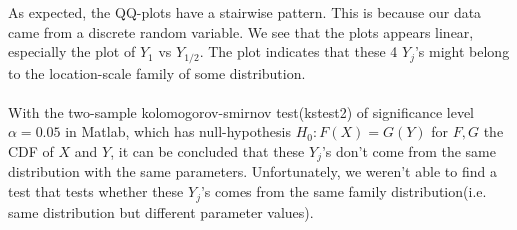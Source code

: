 As expected, the QQ-plots have a stairwise pattern. This is because our data came from a discrete random variable. We see that the plots appears linear, especially the plot of $Y_{1}$ vs $Y_{1/2}$. The plot indicates that these 4 $Y_j$'s might belong to the location-scale family of some distribution.\\
\\
With the two-sample kolomogorov-smirnov test(kstest2) of significance level $\alpha=0.05$ in Matlab, which has null-hypothesis $H_0:F(X)=G(Y)$ for $F,G$ the CDF of $X$ and $Y$, it can be concluded that these $Y_j$'s don't come from the same distribution with the same parameters. Unfortunately, we weren't able to find a test that tests whether these $Y_j$'s comes from the same family distribution(i.e. same distribution but different parameter values).\\
\\
